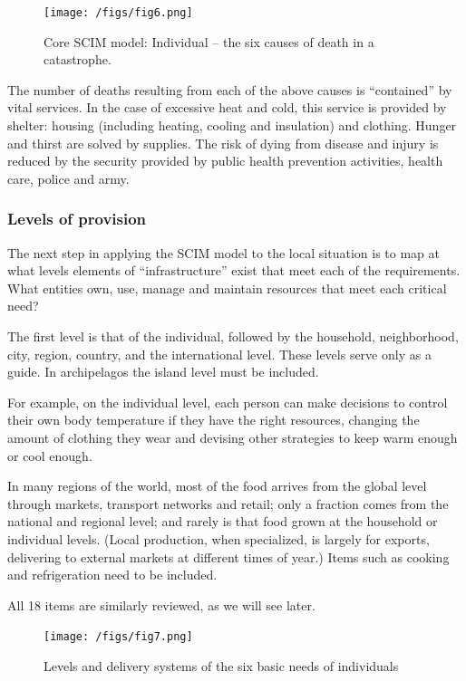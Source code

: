 \documentclass[12pt, a4]{scrartcl}
\begin{document}
\begin{figure}[h]
\centering
\texttt{[image: /figs/fig6.png]}
\caption{Core SCIM model: Individual – the six causes of death in a catastrophe.}
\end{figure}

The number of deaths resulting from each of the above causes is “contained” by vital services. In the case of excessive heat and cold, this service is provided by shelter: housing (including heating, cooling and insulation) and clothing. Hunger and thirst are solved by supplies. The risk of dying from disease and injury is reduced by the security provided by public health prevention activities, health care, police and army.

\subsubsection{Levels of provision}

The next step in applying the SCIM model to the local situation is to map at what levels elements of “infrastructure” exist that meet each of the requirements. What entities own, use, manage and maintain resources that meet each critical need?

The first level is that of the individual, followed by the household, neighborhood, city, region, country, and the international level. These levels serve only as a guide. In archipelagos the island level must be included.

For example, on the individual level, each person can make decisions to control their own body temperature if they have the right resources, changing the amount of clothing they wear and devising other strategies to keep warm enough or cool enough.

In many regions of the world, most of the food arrives from the global level through markets, transport networks and retail; only a fraction comes from the national and regional level; and rarely is that food grown at the household or individual levels. (Local production, when specialized, is largely for exports, delivering to external markets at different times of year.) Items such as cooking and refrigeration need to be included.

All 18 items are similarly reviewed, as we will see later.

\begin{figure}[h]
\centering
\texttt{[image: /figs/fig7.png]}
\caption{Levels and delivery systems of the six basic needs of individuals}
\end{figure}
\end{document}
